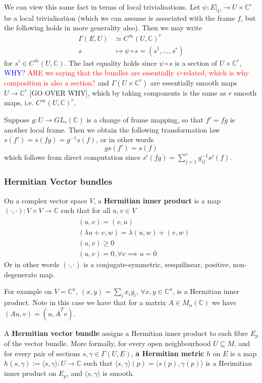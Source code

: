 \documentclass[a4paper]{article}
\theoremstyle{definition} \newtheorem*{definition}{Definition}
\theoremstyle{definition} \newtheorem*{definitions}{Definitions}
\theoremstyle{plain} \newtheorem{theorem}{Theorem}[section]
\theoremstyle{plain} \newtheorem{proposition}[theorem]{Proposition}
\theoremstyle{plain} \newtheorem{corollary}[theorem]{Corollary}
\theoremstyle{plain} \newtheorem{lemma}[theorem]{Lemma}
\theoremstyle{plain} \newtheorem{example}[theorem]{Example}
\newcommand{\checkCorrect}[1]{\textcolor{red}{#1}}
\newcommand{\explainFurther}[1]{\textcolor{blue}{#1}}
\newcommand{\defn}[1]{\textbf{#1}}
\newcommand{\complexnos}{\mathbb{C}}
\newcommand{\smoothCmaps}{C^\infty (U, \complexnos)}
\begin{document}
We can view this same fact in terms of local trivialisations.  Let $\psi: E\vert_U \to U\times \complexnos^r$ be a local trivialisation (which we can assume is associated with the frame $f$,  but the following holds in more generality also).  Then we may write
\begin{align*}
\Gamma(E, U) & \simeq \smoothCmaps^r \\
s & \mapsto \psi\circ s = (s^1, \ldots,  s^r)
\end{align*}
for $s^i\in \smoothCmaps$.  
The last equality holds since $\psi\circ s$ is a section of $U\times \complexnos^r$,
\explainFurther{WHY?} 
\checkCorrect{ARE we saying that the bundles are essentially $\psi$-related, which is why composition is also a section?}
and $\Gamma(U\times \complexnos^r)$ are essentially smooth maps $U\to \complexnos^r$ [GO OVER WHY], which by taking components is the same as $r$ smooth maps,  i.e.  $\smoothCmaps^r$.  

Suppose $g:U\to GL_r(\complexnos)$ is a change of frame mapping, so that $f'=fg$ is another local frame. Then we obtain the following transformation law $s(f')=s(fg)=g^{-1}s(f)$, or in other words
$$gs(f')=s(f)$$
which follows from direct computation since $s^i(fg)=\sum_{j=1}^r g_{ij}^{-1} s^j(f)$.

\subsubsection{Hermitian Vector bundles}
On a complex vector space $V$, a \defn{Hermitian inner product} is a map $(\cdot, \cdot):V\times V\to \complexnos$ such that for all $u,v\in V$
\begin{align*}
& (u,v)=\overline{(v, u)} \\
& (\lambda u + v, w) = \lambda (u, w) + (v, w) \\
& (u, v)\geq 0 \\
& (u,v)=0, \forall v \implies u=0
\end{align*}
Or in other words $(\cdot, \cdot)$ is a conjugate-symmetric, sesquilinear, positive, non-degenerate map. 

For example on $V=\complexnos^n$, $(x, y)=\sum_i x_i\overline{y_i}$, $\forall x,y\in \complexnos^n$, is a Hermitian inner product. Note in this case we have that for a matrix $A\in M_n(\complexnos)$ we have $(Au, v)=(u, \overline{A}^Tv)$.

A \defn{Hermitian vector bundle} assigns a Hermitian inner product to each fibre $E_p$ of the vector bundle. More formally, for every open neighbourhood $U\subseteq M$, and for every pair of sections $s, \gamma \in \Gamma(U, E)$, \defn{a Hermitian metric} $h$ on $E$ is a map $h(s, \gamma):=\langle s, \gamma \rangle:U\to \complexnos$ such that $\langle s, \gamma \rangle(p)=\langle s(p), \gamma (p) \rangle$ is a Herimitian inner product on $E_p$, and $\langle s, \gamma \rangle$ is smooth. 
\end{document}
